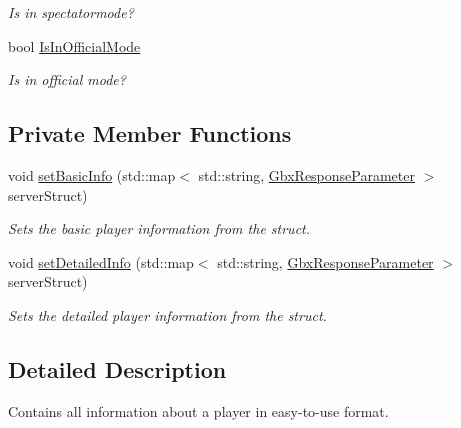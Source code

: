 \begin{DoxyCompactItemize}
\begin{DoxyCompactList}\small\item\em Is in spectatormode? \end{DoxyCompactList}\item 
\hypertarget{structPlayer_a76e8b5298bcbe9ff694b6ed490ef7ca5}{bool \hyperlink{structPlayer_a76e8b5298bcbe9ff694b6ed490ef7ca5}{Is\-In\-Official\-Mode}}\label{structPlayer_a76e8b5298bcbe9ff694b6ed490ef7ca5}

\begin{DoxyCompactList}\small\item\em Is in official mode? \end{DoxyCompactList}\end{DoxyCompactItemize}
\subsection*{Private Member Functions}
\begin{DoxyCompactItemize}
\item 
void \hyperlink{structPlayer_ac4666bfba77342a37f3ab3628b26acd0}{set\-Basic\-Info} (std\-::map$<$ std\-::string, \hyperlink{classGbxResponseParameter}{Gbx\-Response\-Parameter} $>$ server\-Struct)
\begin{DoxyCompactList}\small\item\em Sets the basic player information from the struct. \end{DoxyCompactList}\item 
void \hyperlink{structPlayer_a179183e86a0b9a4b808593be96d65391}{set\-Detailed\-Info} (std\-::map$<$ std\-::string, \hyperlink{classGbxResponseParameter}{Gbx\-Response\-Parameter} $>$ server\-Struct)
\begin{DoxyCompactList}\small\item\em Sets the detailed player information from the struct. \end{DoxyCompactList}\end{DoxyCompactItemize}


\subsection{Detailed Description}
Contains all information about a player in easy-\/to-\/use format. 

